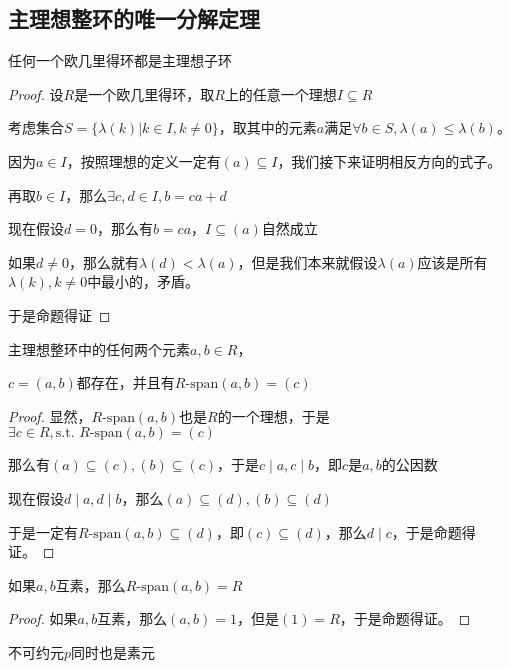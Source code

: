 \documentclass[12pt, a4paper, oneside, UTF8]{ctexbook}
\begin{document}
		\subsection{主理想整环的唯一分解定理}
			\begin{proposition}
				任何一个欧几里得环都是主理想子环
			\end{proposition}
			\begin{proof}
				设$R$是一个欧几里得环，取$R$上的任意一个理想$I \subseteq R$
				
				考虑集合$S = \{\lambda (k)|k \in I,k \neq 0\}$，取其中的元素$a$满足$\forall b \in S,\lambda (a) \leqslant \lambda (b)$。
				
				因为$a \in I$，按照理想的定义一定有$(a) \subseteq I$，我们接下来证明相反方向的式子。
				
				再取$b \in I$，那么$\exists c,d \in I,b=ca+d$
				
				现在假设$d=0$，那么有$b=ca$，$I \subseteq (a)$自然成立
				
				如果$d \neq 0$，那么就有$\lambda (d) <\lambda (a)$，但是我们本来就假设$\lambda (a)$应该是所有$\lambda (k) ,k\neq 0$中最小的，矛盾。
				
				于是命题得证
			\end{proof}
			\begin{proposition}
				主理想整环中的任何两个元素$a,b \in R$，
				
				$c = (a,b)$都存在，并且有$R\text{-span}(a,b) = (c)$
			\end{proposition}
			\begin{proof}
				显然，$R\text{-span}(a,b)$也是$R$的一个理想，于是$\exists c \in R,\text{s.t. } R\text{-span}(a,b)= (c)$
				
				那么有$(a) \subseteq (c),(b)\subseteq (c)$，于是$c\mid a,c\mid b$，即$c$是$a,b$的公因数
				
				现在假设$d \mid a,d\mid b$，那么$(a) \subseteq (d),(b)\subseteq (d)$
				
				于是一定有$R\text{-span}(a,b) \subseteq (d)$，即$(c) \subseteq (d)$，那么$d\mid c$，于是命题得证。
			\end{proof}
			\begin{corollary}{}{}
				如果$a,b$互素，那么$R\text{-span}(a,b)=R$
			\end{corollary}
			\begin{proof}
				如果$a,b$互素，那么$(a,b)=1$，但是$(1)=R$，于是命题得证。
			\end{proof}
			\begin{corollary}{}{}
				不可约元$p$同时也是素元
			\end{corollary}
\end{document}
